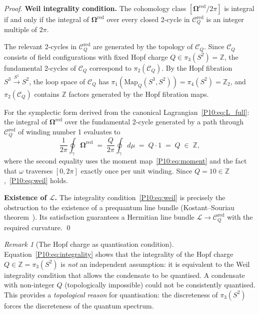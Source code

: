\documentclass[11pt,a4paper]{article}
\theoremstyle{definition}
\theoremstyle{remark}
\newtheorem{remark}[theorem]{Remark}
\newcommand{\ZZ}{\mathbb{Z}}
\newcommand{\CQ}{\mathcal{C}_Q}
\newcommand{\CQr}{\mathcal{C}_Q^{\mathrm{red}}}
\newcommand{\bOmega}{\boldsymbol{\Omega}}
\begin{document}
\begin{proof}
\textbf{Weil integrality condition.}
The cohomology class $[\bOmega^{\mathrm{red}}/2\pi]$ is integral
if and only if the integral of $\bOmega^{\mathrm{red}}$
over every closed 2-cycle in $\CQr$ is an integer multiple of $2\pi$.

The relevant 2-cycles in $\CQr$ are generated by the topology of $\CQ$.
Since $\CQ$ consists of field configurations with fixed Hopf charge
$Q\in\pi_3(S^2)=\ZZ$, the fundamental 2-cycles of $\CQ$ correspond to
$\pi_2(\CQ)$.
By the Hopf fibration $S^3\xrightarrow{S^1}S^2$, the loop space of
$\CQ$ has $\pi_1(\mathrm{Map}_Q(S^3,S^2)) = \pi_4(S^2) = \ZZ_2$,
and $\pi_2(\CQ)$ contains $\ZZ$ factors generated by the Hopf
fibration maps.

For the symplectic form derived from the canonical Lagrangian~\eqref{P10:eq:L_full}:
the integral of $\bOmega^{\mathrm{red}}$ over the
fundamental 2-cycle generated by a path through $\CQr$ of
winding number 1 evaluates to
\begin{equation}
  \frac{1}{2\pi}\oint_\gamma \bOmega^{\mathrm{red}}
  \;=\; \frac{Q}{2\pi}\oint_\gamma d\mu
  \;=\; Q\cdot 1
  \;=\; Q \;\in\;\ZZ,
  \label{P10:eq:integrality}
\end{equation}
where the second equality uses the moment map~\eqref{P10:eq:moment}
and the fact that $\omega$ traverses $[0,2\pi]$ exactly once per
unit winding.
Since $Q=10\in\ZZ$,~\eqref{P10:eq:weil} holds.

\textbf{Existence of $\mathcal{L}$.}
The integrality condition~\eqref{P10:eq:weil} is precisely the obstruction
to the existence of a prequantum line bundle
(Kostant--Souriau theorem~\cite{Woodhouse1992}).
Its satisfaction guarantees a Hermitian line bundle
$\mathcal{L}\to\CQr$ with the required curvature.
\qed
\end{proof}

\begin{remark}[The Hopf charge as quantisation condition]
\label{P10:rem:hopf_charge_quantisation}
Equation~\eqref{P10:eq:integrality} shows that the integrality of the
Hopf charge $Q\in\ZZ=\pi_3(S^2)$ is \emph{not} an independent
assumption: it is equivalent to the Weil integrality condition
that allows the condensate to be quantised.
A condensate with non-integer $Q$ (topologically impossible) could
not be consistently quantised.
This provides a \emph{topological reason} for quantisation:
the discreteness of $\pi_3(S^2)$ forces the discreteness of the
quantum spectrum.
\end{remark}
\end{document}
